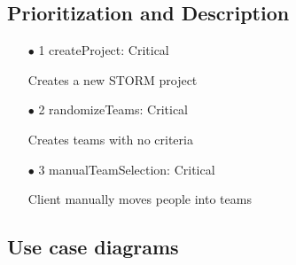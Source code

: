\documentclass[hidelinks, 12pt, oneside]{article}
\begin{document}
\subsection{Prioritization and Description}
\begin{itemize}
\item[$\bullet$] 1 createProject: Critical
\par Creates a new STORM project
\item[$\bullet$] 2 randomizeTeams: Critical
\par Creates teams with no criteria
\item[$\bullet$] 3 manualTeamSelection: Critical
\par Client manually moves people into teams
\end{itemize}

\subsection{Use case diagrams}
\end{document}
